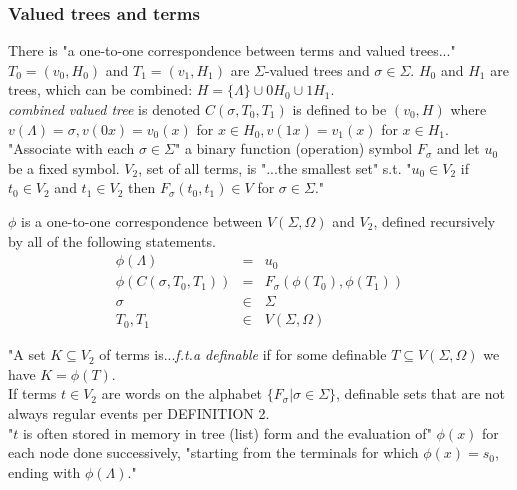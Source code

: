 \newpage

\subsubsection{Valued trees and terms}
There is "a one-to-one correspondence between terms and valued trees..."\\
$T_0 = (v_0, H_0)$ and $T_1 = (v_1, H_1)$ are $\Sigma$-valued trees and $\sigma \in \Sigma$.  $H_0$ and $H_1$ are trees, which can be combined: $H = \{ \Lambda \} \cup 0H_0 \cup 1H_1$.\\
\textit{combined valued tree} is denoted $C(\sigma, T_0, T_1)$ is defined to be $(v_0, H)$ where $v(\Lambda) = \sigma, v(0x) = v_0(x)$ for $x \in H_0, v(1x) = v_1(x)$ for $x \in H_1$.\\
"Associate with each $\sigma \in \Sigma$" a binary function (operation) symbol $F_\sigma$ and let $u_0$ be a fixed symbol.  $V_2$, set of all terms, is "...the
 smallest set" s.t. "$u_0 \in V_2$ if $t_0 \in V_2$ and $t_1 \in V_2$ then $F_\sigma(t_0, t_1) \in V$ for $\sigma \in \Sigma$."\

$\phi$ is a one-to-one correspondence between $V(\Sigma, \Omega)$ and $V_2$, defined recursively by all of the following statements.
\begin{eqnarray}
\phi(\Lambda) &=& u_0 \\
\phi(C(\sigma, T_0, T_1)) &=& F_\sigma(\phi(T_0), \phi(T_1)) \\
\sigma &\in& \Sigma \\
T_0, T_1 &\in& V(\Sigma, \Omega)
\end{eqnarray}

"A set $K \subseteq V_2$ of terms is...\textit{f.t.a definable} if for some definable $T \subseteq V(\Sigma, \Omega)$ we have $K = \phi(T)$.\\
If terms $t \in V_2$ are words on the alphabet $\{ F_{\sigma} | \sigma \in \Sigma \}$, definable sets that are not always regular events per DEFINITION 2.\\
"$t$ is often stored in memory in tree (list) form and the evaluation of" $\phi(x)$ for each node done successively, "starting from the terminals for which $\phi(x) = s_0$, ending with $\phi(\Lambda)$."